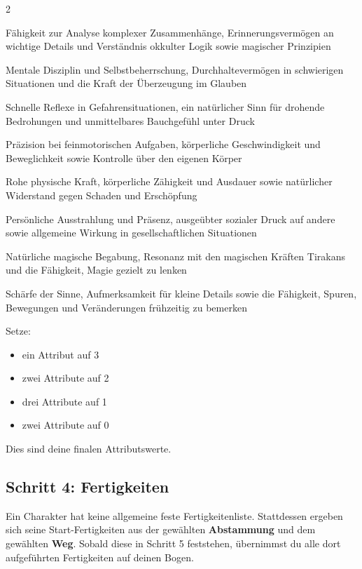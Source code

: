 \begin{multicols*}{2}
\begin{description}[style=nextline,leftmargin=0pt]
\item[\textbf{Geist}] Fähigkeit zur Analyse komplexer Zusammenhänge, Erinnerungsvermögen an wichtige Details und Verständnis okkulter Logik sowie magischer Prinzipien
\item[\textbf{Wille}] Mentale Disziplin und Selbstbeherrschung, Durchhaltevermögen in schwierigen Situationen und die Kraft der Überzeugung im Glauben
\item[\textbf{Instinkt}] Schnelle Reflexe in Gefahrensituationen, ein natürlicher Sinn für drohende Bedrohungen und unmittelbares Bauchgefühl unter Druck
\item[\textbf{Geschick}] Präzision bei feinmotorischen Aufgaben, körperliche Geschwindigkeit und Beweglichkeit sowie Kontrolle über den eigenen Körper
\item[\textbf{Körper}] Rohe physische Kraft, körperliche Zähigkeit und Ausdauer sowie natürlicher Widerstand gegen Schaden und Erschöpfung
\item[\textbf{Erscheinung}] Persönliche Ausstrahlung und Präsenz, ausgeübter sozialer Druck auf andere sowie allgemeine Wirkung in gesellschaftlichen Situationen
\item[\textbf{Gabe}] Natürliche magische Begabung, Resonanz mit den magischen Kräften Tirakans und die Fähigkeit, Magie gezielt zu lenken
\item[\textbf{Wahrnehmung}] Schärfe der Sinne, Aufmerksamkeit für kleine Details sowie die Fähigkeit, Spuren, Bewegungen und Veränderungen frühzeitig zu bemerken
\end{description}

Setze:
\begin{itemize}[leftmargin=*]
\item ein Attribut auf 3
\item zwei Attribute auf 2
\item drei Attribute auf 1
\item zwei Attribute auf 0
\end{itemize}

Dies sind deine finalen Attributswerte.

\subsection{Schritt 4: Fertigkeiten}\label{subsec:schritt-4:-fertigkeiten}

Ein Charakter hat keine allgemeine feste Fertigkeitenliste.
Stattdessen ergeben sich seine Start-Fertigkeiten aus der gewählten \textbf{Abstammung} und dem gewählten \textbf{Weg}.
Sobald diese in Schritt 5 feststehen, übernimmst du alle dort aufgeführten Fertigkeiten auf deinen Bogen.


\end{multicols*}
